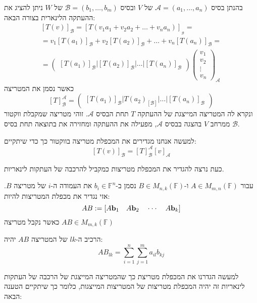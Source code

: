 \documentclass{tstextbook}
\begin{document}
\begin{definition}
בהנתן בסיס \(\mathcal{A}=\left( a_{1},\dots,a_{n} \right)\) של \(V\) ובסיס \(\mathcal{ B}=\left( b_{1},\dots,b_{m} \right)\) של \(W\) ניתן להציג את ההעתקה הלינארית בצורה הבאה:
$$\begin{gather}[T(v)]_{\mathcal{B} }=\left[ T\left( v_{1}a_{1}+v_{2}a_{2}+\dots+v_{n}a_{n} \right) \right]_{\mathcal{_{B}} }= \\=v_{1}[T(a_{1})]_{\mathcal{B} }+v_{2}[T(a_{2})]_{\mathcal{B} }+\dots+v_{n}[T(a_{n})]_{\mathcal{B} }= \\=\begin{pmatrix}[T(a_{1})]_{\mathcal{B} }\bigg| [T(a_{2})]_{\mathcal{B} }\bigg| \dots \bigg| [T(a_{n})]_{\mathcal{B} }\end{pmatrix}\begin{pmatrix}v_{1}\\v_{2}\\\vdots\\v_{n}\end{pmatrix}_{\mathcal{A} } 
\end{gather}$$
כאשר נסמן את המטריצה 
$$[T]_{\mathcal{B}}^{\mathcal{A}}=\begin{pmatrix}[T(a_{1})]_{\mathcal{B}}\bigg| T(a_{2})_\left[ \mathcal{B} \right]\bigg| \dots \bigg| [T(a_{n})]_{\mathcal{B}}\end{pmatrix}$$
ונקרא לה המטריצה המייצגת של ההעתקה \(T\) תחת הבסיס \(\mathcal{ A}\). זוהי מטריצה שמקבלת ווקטור ממרחב \(V\) בהצגה בבסיס \(\mathcal{A}\), מפעילה את ההעתקה ומחזירה את בתוצאה תחת בסיס \(\mathcal{B}\).

\end{definition}
\begin{remark}
למעשה אנחנו מגדירים את המכפלת מטריצה בווקטור כך כדי שיתקיים:
$$[T(v)]_{\mathcal{B} }=[T]_{\mathcal{B} }^{\mathcal{A} }[v]_{\mathcal{A} }$$

\end{remark}
כעת נרצה להגדיר את המכפלת מטריצות כמקביל להרכבה של העתקות לינאריות.

\begin{definition}
עבור \(A \in M_{m,n}\left( \mathbb{F}  \right)\) ו-\(B \in M_{n,k}\left( \mathbb{F}  \right)\) נסמן ב-\(b_{i}\in \mathbb{F} ^{n}\) את העמודה ה-\(i\) של מטריצה \(B\). אזי נגדיר את מכפלת המטריצות להיות:
$$A B:=\left[A{\bf b}_{1}\quad A{\bf b}_{2}\quad\cdot\cdot\cdot\quad A{\bf b}_{k}\right]$$
כאשר נקבל מטריצה \(AB \in M_{m,k}\left( \mathbb{F}  \right)\)

\end{definition}
\begin{corollary}
הרכיב ה-\(lk\) של המטריצה \(AB\) יהיה:
$$AB_{lk}=\sum_{i=1}^{n}\sum_{j=1}^{m} a_{il}b_{kj}$$

\end{corollary}
למעשה הגדרנו את המכפלת מטריצת כך שהמטריצה המייצגת של הרכבה של העתקות לינאריות זה יהיה המכפלת מטריצות של המטריצות המייצגות, כלומר כך שיתקיים הטענה הבאה:
\end{document}
